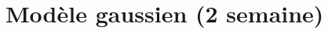 \documentclass[a4paper,12pt]{book}
\newcommand{\method}[2]{
\begin{center}\fbox{%
   \begin{minipage}{0.95\textwidth}
   \noindent\textbf{#1} \\
     \textit{#2}
   \end{minipage}}\end{center}%
}
\begin{document}
\chapter{Modèle gaussien (2 semaine)}
\end{document}
